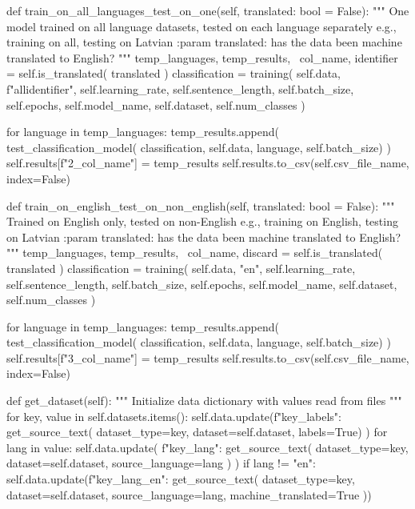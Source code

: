 \begin{python}
  def train_on_all_languages_test_on_one(self, translated: bool = False):
    """ One model trained on all language datasets,
    tested on each language separately
    e.g., training on all, testing on Latvian
    :param translated: has the data been machine translated to English?
    """
    temp_languages, temp_results, \
      col_name, identifier = self.is_translated(
      translated
    )
    classification = training(
      self.data, f"all{identifier}", self.learning_rate,
      self.sentence_length,
      self.batch_size, self.epochs, self.model_name,
      self.dataset, self.num_classes
    )

    for language in temp_languages:
      temp_results.append(
        test_classification_model(
          classification, self.data, language,
          self.batch_size)
      )
    self.results[f"2_{col_name}"] = temp_results
    self.results.to_csv(self.csv_file_name, index=False)

  def train_on_english_test_on_non_english(self, translated: bool = False):
    """ Trained on English only, tested on non-English
    e.g., training on English, testing on Latvian
    :param translated: has the data been machine translated to English?
    """
    temp_languages, temp_results, \
      col_name, discard = self.is_translated(
      translated
    )
    classification = training(
      self.data, "en", self.learning_rate,
      self.sentence_length,
      self.batch_size, self.epochs, self.model_name,
      self.dataset, self.num_classes
    )

    for language in temp_languages:
      temp_results.append(
        test_classification_model(
          classification, self.data, language,
          self.batch_size)
      )
    self.results[f"3_{col_name}"] = temp_results
    self.results.to_csv(self.csv_file_name, index=False)

  def get_dataset(self):
    """ Initialize data dictionary with values read from files
    """
    for key, value in self.datasets.items():
      self.data.update({f"{key}_labels": get_source_text(
        dataset_type=key,
        dataset=self.dataset,
        labels=True)}
      )
      for lang in value:
        self.data.update(
          {f"{key}_{lang}": get_source_text(
            dataset_type=key,
            dataset=self.dataset,
            source_language=lang
          )}
        )
        if lang != "en":
          self.data.update({f"{key}_{lang}_en": get_source_text(
            dataset_type=key,
            dataset=self.dataset,
            source_language=lang,
            machine_translated=True
          )})


\end{python}
